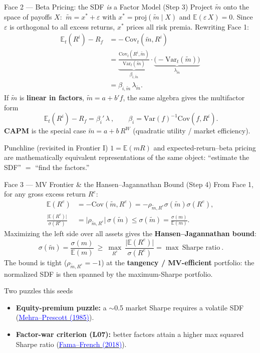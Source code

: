 \documentclass{beamer}
\newcommand{\E}{\mathbb{E}}
\newcommand{\Var}{\mathrm{Var}}
\newcommand{\Cov}{\mathrm{Cov}}
\begin{document}
\begin{frame}{Face 2 --- Beta Pricing: the SDF \emph{is} a Factor Model (Step 3)}
\small
Project $\widetilde m$ onto the space of payoffs $X$: $\ \widetilde m = x^{*} + \varepsilon$ with $x^{*}=\mathrm{proj}(\widetilde m\mid X)$ and $\E(\varepsilon\,X)=0$. Since $\varepsilon$ is orthogonal to all excess returns, $x^{*}$ prices all risk premia. Rewriting Face 1:
\begin{align*}
\E_t(R^i)-R_f &= -\,\Cov_t(\widetilde m,R^i)\\
&= \underbrace{\frac{\Cov_t(R^i,\widetilde m)}{\Var_t(\widetilde m)}}_{\textstyle \beta_{i,\widetilde m}}
\cdot\underbrace{\Big(-\Var_t(\widetilde m)\Big)}_{\textstyle \lambda_{\widetilde m}}\\
&= \beta_{i,\widetilde m}\,\lambda_{\widetilde m}.
\end{align*}
If $\widetilde m$ is \textbf{linear in factors}, $\widetilde m=a+b'f$, the same algebra gives the multifactor form
\[
\boxed{\ \E_t(R^i)-R_f=\beta_i'\,\lambda\ },\qquad \beta_i=\Var(f)^{-1}\Cov(f,R^i).
\]
\textbf{CAPM} is the special case $\widetilde m=a+b\,R^{W}$ (quadratic utility / market efficiency).
\begin{block}{Punchline (revisited in Frontier I)}
$1=\E(mR)$ and expected-return--beta pricing are \alert{mathematically equivalent representations of the same object}: ``estimate the SDF'' $=$ ``find the factors.''
\end{block}
\end{frame}

\begin{frame}{Face 3 --- MV Frontier \& the Hansen--Jagannathan Bound (Step 4)}
\small
From Face 1, for any gross excess return $R^{e}$:
\begin{align*}
\E(R^{e})&=-\Cov(\widetilde m,R^{e})
=-\rho_{\widetilde m,R^e}\sigma(\widetilde m)\sigma(R^{e}),\\
\frac{\big|\E(R^{e})\big|}{\sigma(R^{e})}
&= \big|\rho_{\widetilde m,R^e}\big|\,\sigma(\widetilde m)
\le \sigma(\widetilde m)= \frac{\sigma(m)}{\E(m)} .
\end{align*}
Maximizing the left side over all assets gives the \textbf{Hansen--Jagannathan bound}:
\[
\boxed{\ \sigma(\widetilde m)=\frac{\sigma(m)}{\E(m)}\ \ge\ \max_{R^e}\ \frac{\big|\E(R^{e})\big|}{\sigma(R^{e})}=\max\ \text{Sharpe ratio}\ }.
\]
The bound is \alert{tight} ($\rho_{\widetilde m,R^e}=-1$) at the \textbf{tangency / MV-efficient} portfolio: the normalized SDF is then spanned by the maximum-Sharpe portfolio.
\begin{block}{Two puzzles this seeds}
\begin{itemize}\itemsep1pt
\item \textbf{Equity-premium puzzle:} a $\sim$0.5 market Sharpe requires a volatile SDF (\href{https://doi.org/10.1016/0304-3932(85)90061-3}{\textcolor{blue}{Mehra--Prescott (1985)}}).
\item \textbf{Factor-war criterion (L07):} better factors attain a higher max squared Sharpe ratio (\href{https://doi.org/10.1016/j.jfineco.2018.02.012}{\textcolor{blue}{Fama--French (2018)}}).
\end{itemize}
\end{block}
\end{frame}
\end{document}
